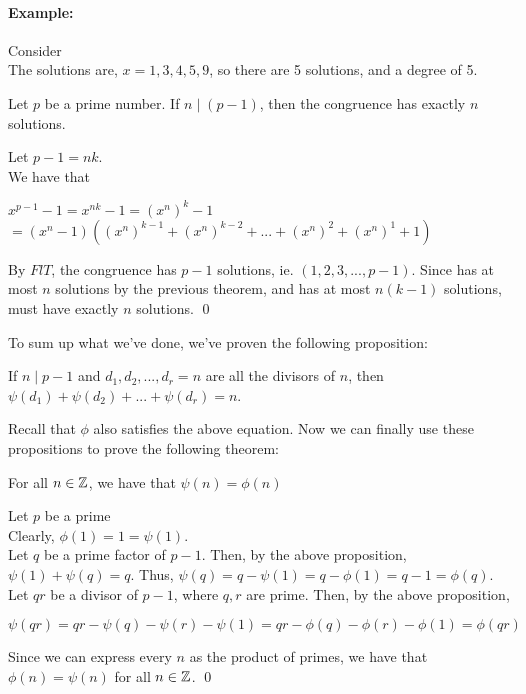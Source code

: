 \documentclass[../main.tex]{subfiles}
\begin{document}
\paragraph{Example:} Consider  \\
The solutions are, $x=1,3,4,5,9$, so there are 5 solutions, and a degree of 5.

\begin{lem}
    Let $p$ be a prime number. If $n \mid (p-1)$, then the congruence  has exactly $n$ solutions.
\end{lem}
\begin{pf}
    Let $p-1=nk$. \\
    We have that 
    \begin{center}
        $x^{p-1}-1=x^{nk}-1=(x^n)^k-1$ \\
        $=(x^n-1)((x^n)^{k-1}+(x^n)^{k-2}+...+(x^n)^2+(x^n)^1+1)$
    \end{center}
    By $FlT$, the congruence  has $p-1$ solutions, ie. $(1,2,3,...,p-1)$. Since  has at most $n$ solutions by the previous theorem, and  has at most $n(k-1)$ solutions,  must have exactly $n$ solutions. \qed
\end{pf}
To sum up what we've done, we've proven the following proposition:
\begin{prop}
    If $n \mid p-1$ and $d_1,d_2,...,d_r=n$ are all the divisors of $n$, then $\psi(d_1)+\psi(d_2)+...+\psi(d_r)=n$.
\end{prop}
Recall that $\phi$ also satisfies the above equation. Now we can finally use these propositions to prove the following theorem:
\begin{thm}
    For all $n \in \mathbb{Z}$, we have that $\psi(n)=\phi(n)$
\end{thm}
\begin{pf}
    Let $p$ be a prime \\
    Clearly, $\phi(1)=1=\psi(1)$. \\
    Let $q$ be a prime factor of $p-1$. Then, by the above proposition, $\psi(1)+\psi(q)=q$. Thus, $\psi(q)=q-\psi(1)=q-\phi(1)=q-1=\phi(q)$. \sspace
    Let $qr$ be a divisor of $p-1$, where $q,r$ are prime. Then, by the above proposition, \\
    \centerline{$\psi(qr)=qr-\psi(q)-\psi(r)-\psi(1)=qr-\phi(q)-\phi(r)-\phi(1)=\phi(qr)$}
    Since we can express every $n$ as the product of primes, we have that $\phi(n)=\psi(n)$ for all $n \in \mathbb{Z}$. \qed
\end{pf}
\end{document}
